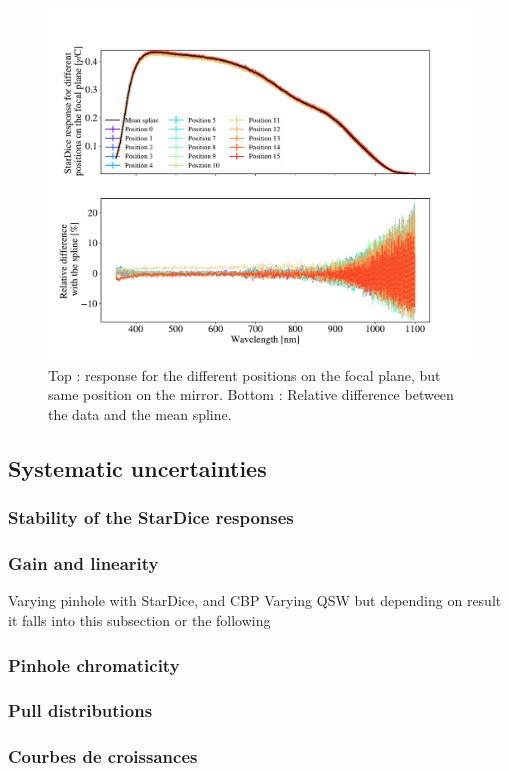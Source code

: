 \begin{figure}[h]
    \centering
    \includegraphics[width=\columnwidth]{fig/ccd_positions.pdf}
    \caption{Top : \SD response for the different positions on the focal plane, but same position on the mirror. Bottom : Relative difference between the data and the mean spline.}
    \label{fig:ccd_positions}
\end{figure}

\subsection{Systematic uncertainties}
\label{sec:systematics}

\subsubsection{Stability of the StarDice responses}

\subsubsection{Gain and linearity}
\label{sec:gain}

Varying pinhole with StarDice, and CBP
Varying QSW but depending on result it falls into this subsection or the following

\subsubsection{Pinhole chromaticity}

\subsubsection{Pull distributions}

\subsubsection{Courbes de croissances}

\showthe\columnwidth


